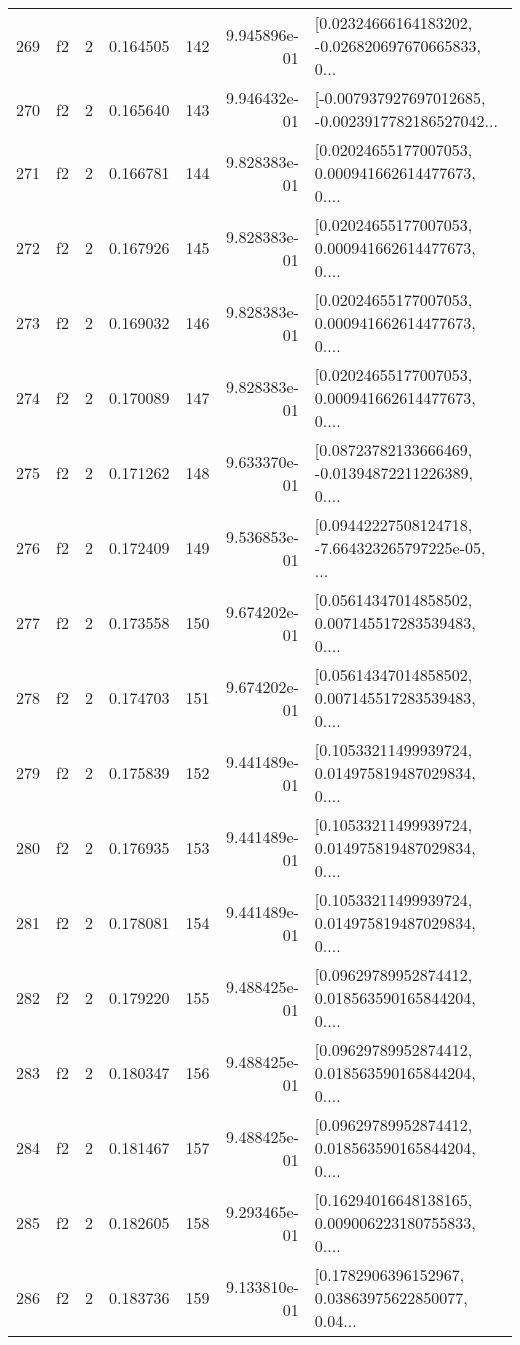 \begin{tabular}{lllrlrl}
269 &  f2 &   2 &  0.164505 &  142 &  9.945896e-01 &  [0.02324666164183202, -0.026820697670665833, 0... \\
270 &  f2 &   2 &  0.165640 &  143 &  9.946432e-01 &  [-0.007937927697012685, -0.0023917782186527042... \\
271 &  f2 &   2 &  0.166781 &  144 &  9.828383e-01 &  [0.02024655177007053, 0.000941662614477673, 0.... \\
272 &  f2 &   2 &  0.167926 &  145 &  9.828383e-01 &  [0.02024655177007053, 0.000941662614477673, 0.... \\
273 &  f2 &   2 &  0.169032 &  146 &  9.828383e-01 &  [0.02024655177007053, 0.000941662614477673, 0.... \\
274 &  f2 &   2 &  0.170089 &  147 &  9.828383e-01 &  [0.02024655177007053, 0.000941662614477673, 0.... \\
275 &  f2 &   2 &  0.171262 &  148 &  9.633370e-01 &  [0.08723782133666469, -0.01394872211226389, 0.... \\
276 &  f2 &   2 &  0.172409 &  149 &  9.536853e-01 &  [0.09442227508124718, -7.664323265797225e-05, ... \\
277 &  f2 &   2 &  0.173558 &  150 &  9.674202e-01 &  [0.05614347014858502, 0.007145517283539483, 0.... \\
278 &  f2 &   2 &  0.174703 &  151 &  9.674202e-01 &  [0.05614347014858502, 0.007145517283539483, 0.... \\
279 &  f2 &   2 &  0.175839 &  152 &  9.441489e-01 &  [0.10533211499939724, 0.014975819487029834, 0.... \\
280 &  f2 &   2 &  0.176935 &  153 &  9.441489e-01 &  [0.10533211499939724, 0.014975819487029834, 0.... \\
281 &  f2 &   2 &  0.178081 &  154 &  9.441489e-01 &  [0.10533211499939724, 0.014975819487029834, 0.... \\
282 &  f2 &   2 &  0.179220 &  155 &  9.488425e-01 &  [0.09629789952874412, 0.018563590165844204, 0.... \\
283 &  f2 &   2 &  0.180347 &  156 &  9.488425e-01 &  [0.09629789952874412, 0.018563590165844204, 0.... \\
284 &  f2 &   2 &  0.181467 &  157 &  9.488425e-01 &  [0.09629789952874412, 0.018563590165844204, 0.... \\
285 &  f2 &   2 &  0.182605 &  158 &  9.293465e-01 &  [0.16294016648138165, 0.009006223180755833, 0.... \\
286 &  f2 &   2 &  0.183736 &  159 &  9.133810e-01 &  [0.1782906396152967, 0.03863975622850077, 0.04... \\

\end{tabular}
